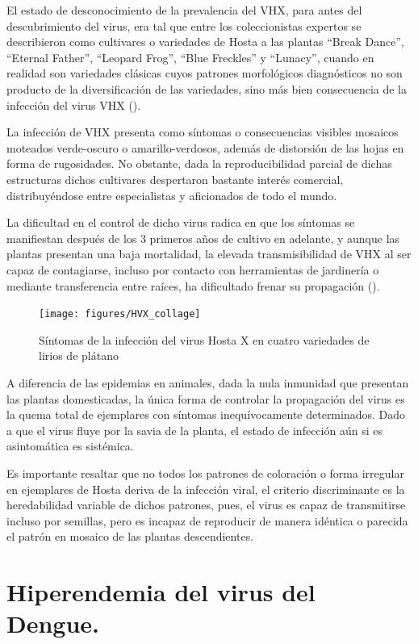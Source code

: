 \documentclass[
  12pt, krantz2,
  spanish,
]{krantz}
\begin{document}
El estado de desconocimiento de la prevalencia del VHX, para antes del descubrimiento del virus, era tal que entre los coleccionistas expertos se describieron como cultivares o variedades de Hosta a las plantas ``Break Dance'', ``Eternal Father'', ``Leopard Frog'', ``Blue Freckles'' y ``Lunacy'', cuando en realidad son variedades clásicas cuyos patrones morfológicos diagnósticos no son producto de la diversificación de las variedades, sino más bien consecuencia de la infección del virus VHX (\citet{valverde2012viruses}).

La infección de VHX presenta como síntomas o consecuencias visibles mosaicos moteados verde-oscuro o amarillo-verdosos, además de distorsión de las hojas en forma de rugosidades. No obstante, dada la reproducibilidad parcial de dichas estructuras dichos cultivares despertaron bastante interés comercial, distribuyéndose entre especialistas y aficionados de todo el mundo.

La dificultad en el control de dicho virus radica en que los síntomas se manifiestan después de los 3 primeros años de cultivo en adelante, y aunque las plantas presentan una baja mortalidad, la elevada transmisibilidad de VHX al ser capaz de contagiarse, incluso por contacto con herramientas de jardinería o mediante transferencia entre raíces, ha dificultado frenar su propagación (\citet{valverde2012viruses}).

\begin{figure}
\texttt{[image: figures/HVX\_collage]} \caption{Síntomas de la infección del virus Hosta X en cuatro variedades de lirios de plátano}\label{fig:hostaX}
\end{figure}

A diferencia de las epidemias en animales, dada la nula inmunidad que presentan las plantas domesticadas, la única forma de controlar la propagación del virus es la quema total de ejemplares con síntomas inequívocamente determinados. Dado a que el virus fluye por la savia de la planta, el estado de infección aún si es asintomática es sistémica.

Es importante resaltar que no todos los patrones de coloración o forma irregular en ejemplares de Hosta deriva de la infección viral, el criterio discriminante es la heredabilidad variable de dichos patrones, pues, el virus es capaz de transmitirse incluso por semillas, pero es incapaz de reproducir de manera idéntica o parecida el patrón en mosaico de las plantas descendientes.

\hypertarget{hiperendemia-del-virus-del-dengue.}{%
\section{Hiperendemia del virus del Dengue.}\label{hiperendemia-del-virus-del-dengue.}}
\end{document}

